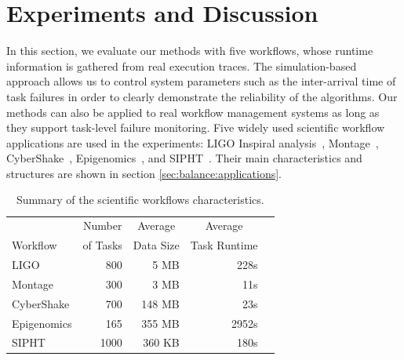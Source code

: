 
\section{Experiments and Discussion}
\label{sec:tolerance:experiments}


In this section, we evaluate our methods with five workflows, whose runtime information is gathered from real execution traces. The simulation-based approach allows us to control system parameters such as the inter-arrival time of task failures in order to clearly demonstrate the reliability of the algorithms. Our methods can also be applied to real workflow management systems as long as they support task-level failure monitoring. 
Five widely used scientific workflow applications are used in the experiments: LIGO Inspiral analysis~\cite{LIGO}, Montage~\cite{Berriman2004}, CyberShake~\cite{Graves2010}, Epigenomics~\cite{Epigenome}, and SIPHT~\cite{SIPHT}. Their main characteristics and structures are shown in section \ref{sec:balance:applications}. 

\begin{table}[!htb]
	\setlength{\tabcolsep}{11pt}
	\centering
	\small
	\begin{tabular}{lrrrr}
		\hline
		 & \multicolumn{1}{c}{Number} & \multicolumn{1}{c}{Average} &  \multicolumn{1}{c}{Average} \\
		Workflow	& of Tasks	 & Data Size & Task Runtime \\
		\hline
		LIGO 		&800		& 5 MB	& 228s\\
		Montage 		&300		&3 MB	&11s\\
		CyberShake 	&700		&148 MB 	& 23s\\
		Epigenomics 	&165 	& 355 MB	& 2952s\\
		SIPHT		&1000	& 360 KB 	& 180s\\
		\hline
	\end{tabular}
	\caption{Summary of the scientific workflows characteristics.}
	\label{tab:evaluation_workflows}
\end{table} 

